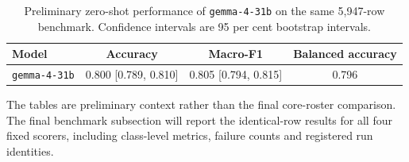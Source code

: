 \documentclass[11pt,a4paper,oneside]{book}
\newif\ifshowdraftnotes
\newcommand{\draftnote}[1]{%
  \ifshowdraftnotes
    \par\smallskip
    \noindent{\color{draftgrey}\small\itshape Drafting note: #1\par}
    \smallskip
  \fi
}
\begin{document}
\begin{table}[htbp]
  \centering
  \caption{Preliminary classification performance on the provenance-clean benchmark. Confidence intervals are 95 per cent bootstrap intervals.}
  \label{tab:preliminary-baselines}
\end{table}

\begin{table}[htbp]
  \centering
  \small
  \begin{tabular}{lccc}
    \toprule
    Model & Accuracy & Macro-F1 & Balanced accuracy \\
    \midrule
    \texttt{gemma-4-31b} & 0.800 [0.789, 0.810] & 0.805 [0.794, 0.815] & 0.796 \\
    \bottomrule
  \end{tabular}
  \caption{Preliminary zero-shot performance of \texttt{gemma-4-31b} on the same 5,947-row benchmark. Confidence intervals are 95 per cent bootstrap intervals.}
  \label{tab:preliminary-gemma}
\end{table}

The tables are preliminary context rather than the final core-roster comparison.
The final benchmark subsection will report the identical-row results for all four fixed scorers, including class-level metrics, failure counts and registered run identities.

\draftnote{Replace the preliminary tables with the frozen four-scorer benchmark asset and discuss only values reproduced from the registered result bundle.}
\end{document}
